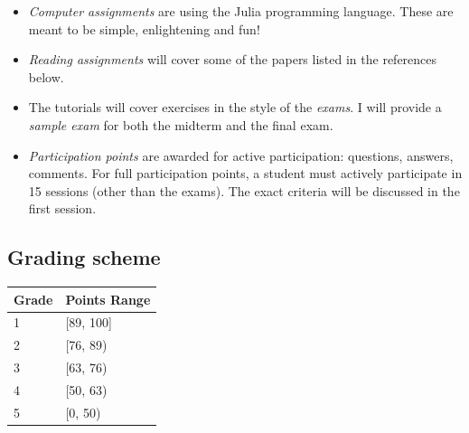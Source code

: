 \documentclass[a4paper, 11pt]{article}
\begin{document}
\begin{itemize}
  \item \emph{Computer assignments} are using the Julia programming language. These are meant to be simple, enlightening and fun!
  \item \emph{Reading assignments} will cover some of the papers listed in the references below.
  
  \item The tutorials will cover exercises in the style of the \emph{exams}. I will provide a \emph{sample exam} for both the midterm and the final exam. 
  
  \item \emph{Participation points} are awarded for active participation: questions, answers, comments. For full participation points, a student must actively participate in 15 sessions (other than the exams). The exact criteria will be discussed in the first session.
\end{itemize}


\subsection*{Grading scheme}

\begin{tabular}{ll}
\toprule
Grade & Points Range \\
\midrule
1 & [89, 100] \\
2 & [76, 89) \\
3 & [63, 76) \\
4 & [50, 63) \\
5 & [0, 50) \\
\bottomrule
\end{tabular}




\end{document}
